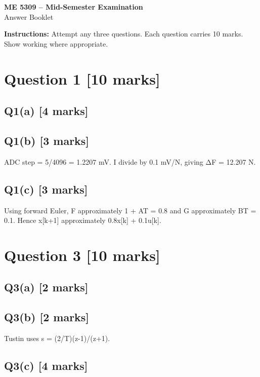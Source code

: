 \documentclass[11pt,a4paper]{article}
\begin{document}
\begin{center}
{\Large\bfseries ME 5309 -- Mid-Semester Examination}\\[3pt]
{\large Answer Booklet}\\[8pt]
\end{center}
\textbf{Instructions:} Attempt any three questions. Each question carries 10 marks. Show working where appropriate.
\section*{Question 1 \hfill [10 marks]}
\subsection*{Q1(a) \hfill [4 marks]}

\vspace{2mm}

\subsection*{Q1(b) \hfill [3 marks]}

ADC step = 5/4096 = 1.2207 mV.
I divide by 0.1 mV/N, giving ΔF = 12.207 N.

\subsection*{Q1(c) \hfill [3 marks]}

Using forward Euler, F approximately 1 + AT = 0.8 and G approximately BT = 0.1.
Hence x[k+1] approximately 0.8x[k] + 0.1u[k].

\section*{Question 3 \hfill [10 marks]}
\subsection*{Q3(a) \hfill [2 marks]}

\vspace{2mm}

\subsection*{Q3(b) \hfill [2 marks]}

Tustin uses s = (2/T)(z-1)/(z+1).

\subsection*{Q3(c) \hfill [4 marks]}
\end{document}
